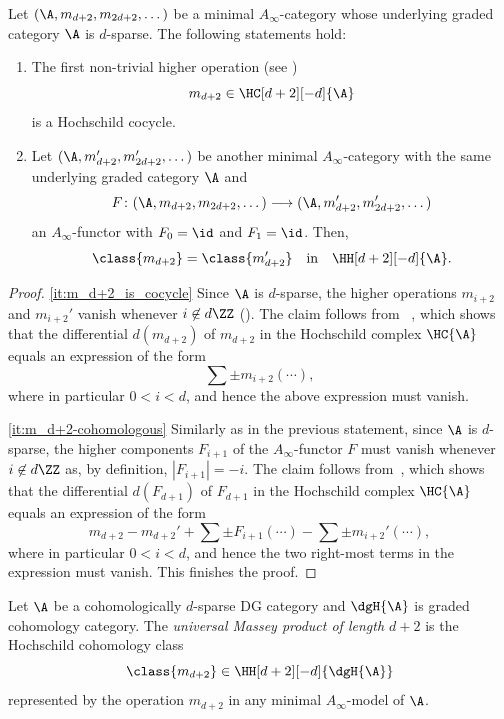 \documentclass[a4paper]{amsart}
\begin{document}
\begin{proposition}
  \label{prop:universal_Massey_welldef}
  Let $(\A,m_{d+2},m_{2d+2},\dots)$ be a minimal $A_\infty$-category whose
  underlying graded category $\A$ is $d$-sparse. The following statements hold:
  \begin{enumerate}
  \item\label{it:m_d+2_is_cocycle}The first non-trivial higher operation (see
    )
    \[
      m_{d+2}\in\HC[d+2][-d]{\A}
    \]
    is a Hochschild cocycle. 
    \item\label{it:m_d+2-cohomologous} Let
    $(\A,m_{d+2}',m_{2d+2}',\dots)$ be another minimal $A_\infty$-category with the same 
    underlying graded category $\A$ and
    \[
      F\colon(\A,m_{d+2},m_{2d+2},\dots)\longrightarrow(\A,m_{d+2}',m_{2d+2}',\dots)
    \]
    an $A_\infty$-functor with $F_0=\id$ and $F_1=\id$. Then,
    \[
      \class{m_{d+2}}=\class{m_{d+2}'}\quad\text{in}\quad\HH[d+2][-d]{\A}.
    \]
  \end{enumerate}
\end{proposition}
\begin{proof}
  \eqref{it:m_d+2_is_cocycle} Since $\A$ is $d$-sparse, the higher operations
  $m_{i+2}$ and $m_{i+2}'$ vanish whenever $i\not\in d\ZZ$
  (). The claim follows from
  ~\cite[Lemma~B.4.1]{Lef03}, which shows that the differential $d(m_{d+2})$ of
  $m_{d+2}$ in the Hochschild complex $\HC{\A}$ equals an expression of the form
  \[
    \sum\pm m_{i+2}(\cdots),
  \]
  where in particular $0<i<d$, and hence the above expression must vanish.

  \eqref{it:m_d+2-cohomologous} Similarly as in the previous statement, since
  $\A$ is $d$-sparse, the higher components $F_{i+1}$ of the $A_\infty$-functor
  $F$ must vanish whenever $i\not\in d\ZZ$ as, by definition, $|F_{i+1}|=-i$.
  The claim follows from~\cite[Lemma~B.4.2]{Lef03}, which shows that the
  differential $d(F_{d+1})$ of $F_{d+1}$ in the Hochschild complex
  $\HC{\A}$ equals an expression of the form
  \[
    m_{d+2}-m_{d+2}'+\sum\pm F_{i+1}(\cdots)-\sum\pm m_{i+2}'(\cdots),
  \]
  where in particular $0<i<d$, and hence the two right-most terms in the
  expression must vanish. This finishes the proof.
\end{proof}

\begin{definition}
  \label{def:universal_Massey}
  Let $\A$ be a cohomologically $d$-sparse DG category and $\dgH{\A}$ is graded
  cohomology category. The \emph{universal
    Massey product of length $d+2$} is the Hochschild cohomology class
  \[
    \class{m_{d+2}}\in\HH[d+2][-d]{\dgH{\A}}
  \]
  represented by the operation $m_{d+2}$ in any minimal $A_\infty$-model of
  $\A$.
\end{definition}
\end{document}
